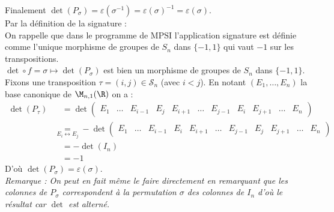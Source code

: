 \documentclass[8pt]{book}
\begin{document}
\begin{enumerate}[leftmargin=*]
		Finalement $\det(P_\sigma)=\varepsilon(\sigma^{-1})=\varepsilon(\sigma)^{-1}=\varepsilon(\sigma)$.\\
		Par la définition de la signature :\\
		On rappelle que dans le programme de MPSI l'application signature est définie comme l'unique morphisme de groupes de $S_n$ dans $\{-1,1\}$ qui vaut $-1$ sur les transpositions.\\
		$\det\circ f=\sigma\mapsto\det(P_\sigma)$ est bien un morphisme de groupes de $S_n$ dans $\{-1,1\}$.\\
		Fixons une transposition $\tau=(i,j)\in \mathcal S_n$ (avec $i<j$). En notant $(E_1,\dots,E_n)$ la base canonique de $\M_{n,1}(\R)$ on a :
		\begin{align*}
			\det(P_\tau)&\ \ \ \ =\det\left(\begin{array}{c|c|c|c|c|c|c|c|c|c|c}
				E_1&\dots&E_{i-1}&E_j&E_{i+1}&\dots&E_{j-1}&E_i&E_{j+1}&\dots&E_n
			\end{array}\right)\\
			&\underset{E_i\longleftrightarrow E_j}{=}-\det\left(\begin{array}{c|c|c|c|c|c|c|c|c|c|c}
				E_1&\dots&E_{i-1}&E_i&E_{i+1}&\dots&E_{j-1}&E_j&E_{j+1}&\dots&E_n
			\end{array}\right)\\
			&\ \ \ \ =-\det(I_n)\\
			&\ \ \ \ =-1
		\end{align*}
		D'où $\det(P_\sigma)=\varepsilon(\sigma)$.\\
		\textit{Remarque : On peut en fait même le faire directement en remarquant que les colonnes de $P_\sigma$ correspondent à la permutation $\sigma$ des colonnes de $I_n$ d'où le résultat car $\det$ est alterné.}
	\end{enumerate}
	
\end{document}
